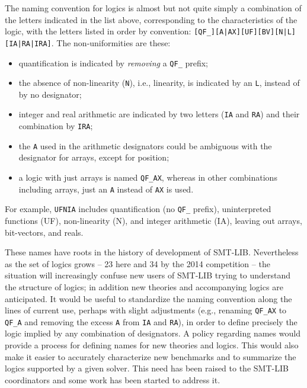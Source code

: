 \documentclass{eptcs}
\begin{document}
The naming convention for logics is almost but not quite simply a combination of the letters indicated in the list above,
corresponding to the characteristics of the logic, with the letters listed in order by convention: {\tt [QF\_][A|AX][UF][BV][N|L][IA|RA|IRA]}. The non-uniformities are these:
\begin{itemize}[noitemsep,nolistsep]
\item quantification is indicated by {\em removing} a {\tt QF\_} prefix;
\item the absence of non-linearity ({\tt N}), i.e., linearity, is indicated by an {\tt L}, instead of by no designator; 
\item integer and real arithmetic are indicated by two letters ({\tt IA} and {\tt RA}) and their combination by {\tt IRA}; \item the {\tt A} used in the arithmetic designators could be ambiguous with the designator for arrays, except for position;
\item a logic with just arrays is named {\tt QF\_AX}, whereas in other combinations including arrays, just an {\tt A} instead of {\tt AX} is used.
\end{itemize}
For example, {\tt UFNIA} includes quantification (no {\tt QF\_} prefix), uninterpreted functions (UF), non-linearity (N), and integer arithmetic (IA), leaving out arrays, bit-vectors, and reals.

These names have roots in the history of development of SMT-LIB. Nevertheless as the set of logics grows -- 23 here and 34 by the 2014 competition -- the situation will increasingly confuse new users of SMT-LIB trying to understand the structure of logics; in addition new theories and accompanying logics are anticipated.
It would be useful to standardize the naming convention along the lines of current use, perhaps with slight adjustments (e.g., renaming {\tt QF\_AX} to {\tt QF\_A} and removing the excess {\tt A} from {\tt IA} and {\tt RA}), in order to define precisely the logic implied by any combination of designators. A policy regarding names would provide a process for defining names for new theories and logics. This would
also make it easier to accurately characterize new benchmarks and to summarize the logics supported by a given solver. This need has been raised to the SMT-LIB coordinators and some work has been started to address it.
\end{document}
